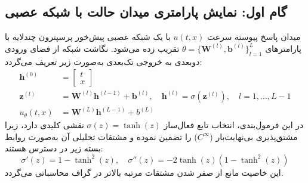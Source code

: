 \subsection{گام اول: نمایش پارامتری میدان حالت با شبکه عصبی}
میدان پاسخ پیوسته سرعت $u(t,x)$ با یک شبکه عصبی پیش‌خور پرسپترون چندلایه با پارامترهای $\theta = \{\mathbf{W}^{(l)}, \mathbf{b}^{(l)}\}_{l=1}^L$ تقریب زده می‌شود. نگاشت شبکه از فضای ورودی دوبعدی به خروجی تک‌بعدی به‌صورت زیر تعریف می‌گردد:
\begin{equation}
\begin{aligned}
\mathbf{h}^{(0)} &= \begin{bmatrix} t \\ x \end{bmatrix} \\
\mathbf{z}^{(l)} &= \mathbf{W}^{(l)} \mathbf{h}^{(l-1)} + \mathbf{b}^{(l)}, \quad \mathbf{h}^{(l)} = \sigma\left(\mathbf{z}^{(l)}\right), \quad l=1,\dots,L-1 \\
u_\theta(t,x) &= \mathbf{W}^{(L)} \mathbf{h}^{(L-1)} + b^{(L)}
\end{aligned}
\label{eq:mlp-burgers}
\end{equation}
در این فرمول‌بندی، انتخاب تابع فعال‌ساز $\sigma(z) = \tanh(z)$ نقشی کلیدی دارد، زیرا مشتق‌پذیری بی‌نهایت‌بار ($C^\infty$) را تضمین نموده و مشتقات تحلیلی آن به‌صورت روابط بسته زیر در دسترس هستند:
\begin{equation}
\sigma'(z) = 1 - \tanh^2(z), \quad \sigma''(z) = -2\tanh(z)\left(1 - \tanh^2(z)\right)
\end{equation}
این خاصیت مانع از صفر شدن مشتقات مرتبه بالاتر در گراف محاسباتی می‌گردد.

